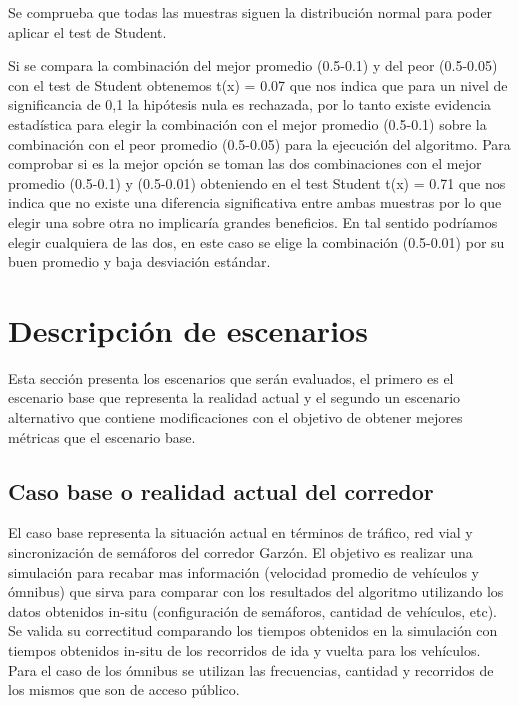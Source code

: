 Se comprueba que todas las muestras siguen la distribución normal para poder aplicar el test de Student. 

%
%

Si se compara la combinación del mejor promedio (0.5-0.1) y del peor (0.5-0.05) con el test de Student obtenemos t(x) = 0.07 que nos indica que para un nivel de significancia de  0,1 la hipótesis nula es rechazada, por lo tanto existe evidencia estadística para elegir la combinación con el mejor promedio (0.5-0.1) sobre la combinación con el peor promedio (0.5-0.05) para la ejecución del algoritmo. Para comprobar si es la mejor opción  se toman las dos combinaciones con el mejor promedio (0.5-0.1) y (0.5-0.01) obteniendo en el test Student t(x) = 0.71 que nos indica que no existe una diferencia significativa entre ambas muestras por lo que elegir una sobre otra no implicaría grandes beneficios. En tal sentido podríamos elegir cualquiera de las dos, en este caso se elige  la combinación (0.5-0.01) por su buen promedio y baja desviación estándar.



\section{Descripción de escenarios}
Esta sección presenta los escenarios que serán evaluados, el primero es el escenario base que representa la realidad actual y el segundo un escenario alternativo que contiene modificaciones con el objetivo de obtener mejores métricas que el escenario base.

\subsection{Caso base o realidad actual del corredor}
El caso base representa la situación actual en términos de tráfico, red vial y sincronización de semáforos del corredor Garzón. El objetivo es realizar una simulación para recabar mas información (velocidad promedio de vehículos y ómnibus) que sirva para comparar con los resultados del algoritmo utilizando los datos obtenidos in-situ (configuración de semáforos, cantidad de vehículos, etc).  Se valida su correctitud comparando los tiempos obtenidos en la simulación con tiempos obtenidos in-situ de los recorridos de ida y vuelta para los vehículos. Para el caso de los ómnibus se utilizan las frecuencias, cantidad y recorridos de los mismos que son de acceso público.

